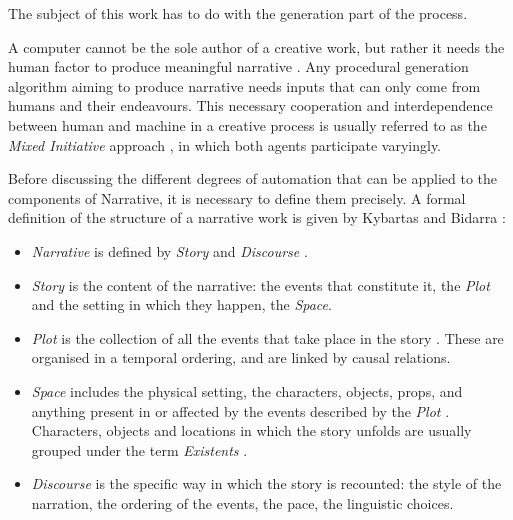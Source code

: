 \documentclass[12pt,a4paper,oneside]{report}
\begin{document}
\bigskip

The subject of this work has to do with the generation part of the process.

\bigskip

A computer cannot be the sole author of a creative work, but rather it needs the human factor to produce meaningful narrative \cite{lubart05}. Any procedural generation algorithm aiming to produce narrative needs inputs that can only come from humans and their endeavours. This necessary cooperation and interdependence between human and machine in a creative process is usually referred to as the \textit{Mixed Initiative} approach \cite{negroponte75}, in which both agents participate varyingly.

Before discussing the different degrees of automation that can be applied to the components of Narrative, it is necessary to define them precisely. A formal definition of the structure of a narrative work is given by Kybartas and Bidarra \cite{kybartasbidarra17}:

\begin{itemize}\setlength{\itemsep}{8pt}
\item \textit{Narrative} is defined by \textit{Story} and \textit{Discourse} \cite{abbott08}.
\item \textit{Story} is the content of the narrative: the events that constitute it, the \textit{Plot} and the setting in which they happen, the \textit{Space}.
\item \textit{Plot} is the collection of all the events that take place in the story \cite{kukkonen14}. These are organised in a temporal ordering, and are linked by causal relations.
\item \textit{Space} includes the physical setting, the characters, objects, props, and anything present in or affected by the events described by the \textit{Plot} \cite{ryan14}. Characters, objects and locations in which the story unfolds are usually grouped under the term \textit{Existents} \cite{chatman80}.
\item \textit{Discourse} is the specific way in which the story is recounted: the style of the narration, the ordering of the events, the pace, the linguistic choices.
\end{itemize}
\end{document}
